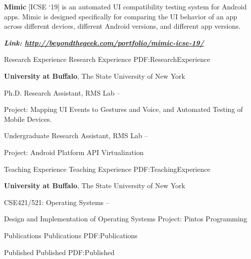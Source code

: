\documentclass[letterpaper,MMMyyyy,nonstopmode]{simpleresumecv}
\begin{document}
\begin{Body}
\Gap
\BulletItem
\textbf{Mimic} [ICSE `19] is an automated UI compatibility testing system for Android apps. 
Mimic is designed specifically for comparing the UI behavior of an app across different 
devices, different Android versions, and different app versions.

\hspace{2ex}
\textbf{\textit{Link: \href{http://beyondthegeek.com/portfolio/mimic-icse-19/}{http://beyondthegeek.com/portfolio/mimic-icse-19/}}}
\hfill



\Section
{Research Experience}
{Research Experience}
{PDF:ResearchExperience}

\Entry
\textbf{University at Buffalo}, The State University of New York

\Gap
\BulletItem
Ph.D. Research Assistant, RMS Lab
\hfill
{} --
\begin{Detail}
\SubBulletItem
Project:
Mapping UI Events to Gestures and Voice, and Automated Testing of Mobile Devices.
\end{Detail}

\Gap
\BulletItem
Undergraduate Research Assistant, RMS Lab
\hfill
{} --
\begin{Detail}
\SubBulletItem
Project:
Android Platform API Virtualization
\end{Detail}


\Section
{Teaching Experience}
{Teaching Experience}
{PDF:TeachingExperience}

\Entry
\textbf{University at Buffalo}, The State University of New York

\Gap
\BulletItem
CSE421/521: Operating Systems
\hfill
{} --
\begin{Detail}
\SubBulletItem
Design and Implementation of Operating Systems
\SubBulletItem
Project: Pintos Programming
\end{Detail}




\Section
{Publications}
{Publications}
{PDF:Publications}

\SubSection
{Published}
{Published}
{PDF:Published}


\end{Body}
\end{document}
